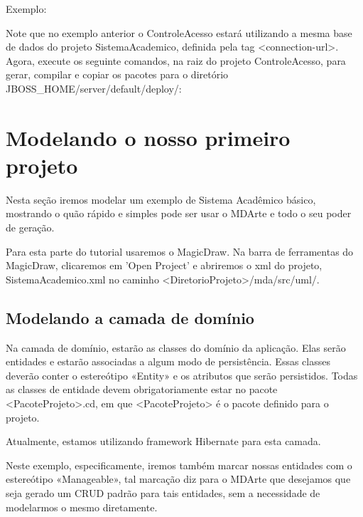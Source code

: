 Exemplo:

\begin{framed}
	
\end{framed}

Note que no exemplo anterior o ControleAcesso estará utilizando a mesma base de dados do projeto SistemaAcademico, definida pela tag <connection-url>. Agora, execute os seguinte comandos, na raiz do projeto ControleAcesso, para gerar, compilar e copiar os pacotes para o diretório JBOSS\_HOME/server/default/deploy/:

\begin{framed}
	
\end{framed}

\section{Modelando o nosso primeiro projeto}

Nesta seção iremos modelar um exemplo de Sistema Acadêmico básico, mostrando o quão rápido e simples pode ser usar o MDArte e todo o seu poder de geração.

Para esta parte do tutorial usaremos o MagicDraw. Na barra de ferramentas do MagicDraw, clicaremos em 'Open Project' e abriremos o xml do projeto, SistemaAcademico.xml no caminho <DiretorioProjeto>/mda/src/uml/.

\subsection{Modelando a camada de domínio}
Na camada de domínio, estarão as classes do domínio da aplicação. Elas serão entidades e estarão associadas a algum modo de persistência. Essas classes deverão conter o estereótipo «Entity» e os atributos que serão persistidos. Todas as classes de entidade devem obrigatoriamente estar no pacote <PacoteProjeto>.cd, em que <PacoteProjeto> é o pacote definido para o projeto.

Atualmente, estamos utilizando framework Hibernate para esta camada. 

Neste exemplo, especificamente, iremos também marcar nossas entidades com o estereótipo «Manageable», tal marcação diz para o MDArte que desejamos que seja gerado um CRUD padrão para tais entidades, sem a necessidade de modelarmos o mesmo diretamente.

